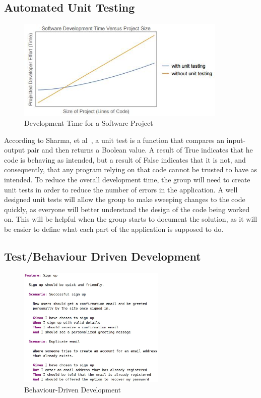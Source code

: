 \subsection{Automated Unit Testing}

\begin{figure}
  \centering
  \begin{minipage}{7cm}
    \centering
    \includegraphics[width=10cm]{inc/automated_unit_testing.jpg}
    \caption{Development Time for a Software Project}
    \label{fig:automated_unit_testing}
  \end{minipage}
\end{figure}

According to Sharma, et al~\parencite{rep:unit_testing_validation}, a unit test is a function that compares an input-output pair and then returns a Boolean value. A result of True indicates that he code is behaving as intended, but a result of False indicates that it is not, and consequently, that any program relying on that code cannot be trusted to have as intended. To reduce the overall development time, the group will need to create unit tests in order to reduce the number of errors in the application. A well designed unit tests will allow the group to make sweeping changes to the code quickly, as everyone will better understand the design of the code being worked on. This will be helpful when the group starts to document the solution, as it will be easier to define what each part of the application is supposed to do.

\subsection{Test/Behaviour Driven Development}

\begin{figure}
  \centering
  \begin{minipage}{7cm}
    \centering
    \includegraphics[width=7cm]{inc/behaviour_driven_development.jpg}
    \caption{Behaviour-Driven Development}
    \label{fig:behaviour_driven_development}
  \end{minipage}
\end{figure}

